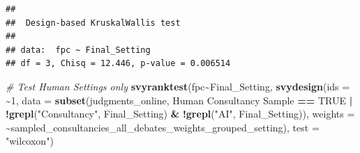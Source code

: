\documentclass[
]{article}
\newenvironment{Shaded}{\begin{snugshade}}{\end{snugshade}}
\newcommand{\AttributeTok}[1]{\textcolor[rgb]{0.13,0.29,0.53}{#1}}
\newcommand{\CommentTok}[1]{\textcolor[rgb]{0.56,0.35,0.01}{\textit{#1}}}
\newcommand{\ConstantTok}[1]{\textcolor[rgb]{0.56,0.35,0.01}{#1}}
\newcommand{\DecValTok}[1]{\textcolor[rgb]{0.00,0.00,0.81}{#1}}
\newcommand{\FunctionTok}[1]{\textcolor[rgb]{0.13,0.29,0.53}{\textbf{#1}}}
\newcommand{\NormalTok}[1]{#1}
\newcommand{\OtherTok}[1]{\textcolor[rgb]{0.56,0.35,0.01}{#1}}
\newcommand{\SpecialCharTok}[1]{\textcolor[rgb]{0.81,0.36,0.00}{\textbf{#1}}}
\newcommand{\StringTok}[1]{\textcolor[rgb]{0.31,0.60,0.02}{#1}}
\begin{document}
\begin{Shaded}
\end{Shaded}

\begin{verbatim}
## 
##  Design-based KruskalWallis test
## 
## data:  fpc ~ Final_Setting
## df = 3, Chisq = 12.446, p-value = 0.006514
\end{verbatim}

\begin{Shaded}
\begin{Highlighting}[]
\CommentTok{\# Test Human Settings only}
\FunctionTok{svyranktest}\NormalTok{(fpc}\SpecialCharTok{\textasciitilde{}}\NormalTok{Final\_Setting, }
            \FunctionTok{svydesign}\NormalTok{(}\AttributeTok{ids =} \SpecialCharTok{\textasciitilde{}}\DecValTok{1}\NormalTok{, }\AttributeTok{data =} \FunctionTok{subset}\NormalTok{(judgments\_online, }\StringTok{\textasciigrave{}}\AttributeTok{Human Consultancy Sample}\StringTok{\textasciigrave{}} \SpecialCharTok{==} \ConstantTok{TRUE} \SpecialCharTok{|} \SpecialCharTok{!}\FunctionTok{grepl}\NormalTok{(}\StringTok{"Consultancy"}\NormalTok{, Final\_Setting) }\SpecialCharTok{\&} \SpecialCharTok{!}\FunctionTok{grepl}\NormalTok{(}\StringTok{"AI"}\NormalTok{, Final\_Setting)), }\AttributeTok{weights =} \SpecialCharTok{\textasciitilde{}}\NormalTok{sampled\_consultancies\_all\_debates\_weights\_grouped\_setting),}
            \AttributeTok{test =} \StringTok{"wilcoxon"}\NormalTok{)}
\end{Highlighting}
\end{Shaded}
\end{document}
